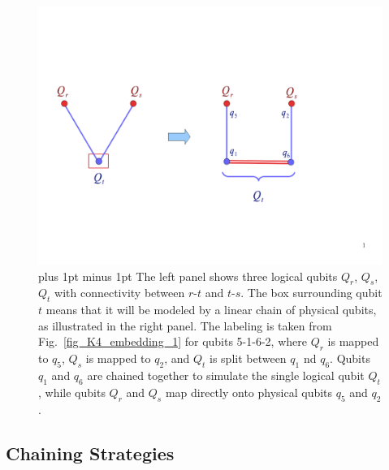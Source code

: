 \documentclass[preprint,12pt,eqsecnum,nofootinbib,amsmath,amssymb]{revtex4}
\newcommand{\footnoteskip}{\baselineskip 12pt plus 1pt minus 1pt}
\begin{document}
%
\begin{figure}[h!]
\includegraphics[scale=0.40]{figs/linear_chain_linear.png} 
\vskip-2.0cm
\caption{\footnoteskip  
The left panel shows three logical qubits $Q_r$, $Q_s$, $Q_t$ with connectivity 
between $r$-$t$ and $t$-$s$. The box surrounding qubit $t$ means that it
will be modeled by a linear chain of physical qubits, as illustrated in the right
panel. The labeling is taken from Fig.~\ref{fig_K4_embedding_1} for qubits
5-1-6-2, where $Q_r$ is mapped to $q_5$, $Q_s$ is mapped to $q_2$, and
$Q_t$ is split between $q_1$ nd $q_6$. Qubits $q_1$ and $q_6$ are chained 
together to simulate the single logical qubit $Q_t$, while qubits $Q_r$ and 
$Q_s$ map directly onto physical qubits $q_5$ and $q_2$.
}
\label{fig_linear_chain_a}
\end{figure}
%

\subsection{Chaining Strategies}
\end{document}
